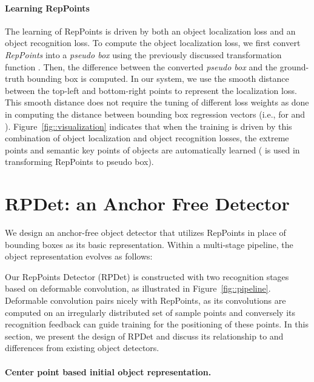 \documentclass[10pt,twocolumn,letterpaper]{article}
\begin{document}
\vspace{-10pt}
\paragraph{Learning RepPoints}

The learning of RepPoints is driven by both an object localization loss and an object recognition loss. To compute the object localization loss, we first convert \textit{RepPoints} into a \textit{pseudo box} using the previously discussed transformation function . Then, the difference between the converted \textit{pseudo box} and the ground-truth bounding box is computed. In our system, we use the smooth  distance between the top-left and bottom-right points to represent the localization loss. This smooth  distance does not require the tuning of different loss weights as done in computing the distance between bounding box regression vectors (i.e., for  and ).
Figure~\ref{fig::visualization} indicates that when the training is driven by this combination of object localization and object recognition losses, the extreme points and semantic key points of objects are automatically learned ( is used in transforming RepPoints to pseudo box).
 
\vspace{-.5em}
\section{RPDet: an Anchor Free Detector}
\label{sec::framework}

We design an anchor-free object detector that utilizes RepPoints in place of bounding boxes as its basic representation. Within a multi-stage pipeline, the object representation evolves as follows:


Our RepPoints Detector (RPDet) is constructed with two recognition stages based on deformable convolution, as illustrated in Figure~\ref{fig::pipeline}. Deformable convolution pairs nicely with RepPoints, as its convolutions are computed on an irregularly distributed set of sample points and conversely its recognition feedback can guide training for the positioning of these points. In this section, we present the design of RPDet and discuss its relationship to and differences from existing object detectors.

\vspace{-5pt}
\paragraph{Center point based initial object representation.}
\end{document}
